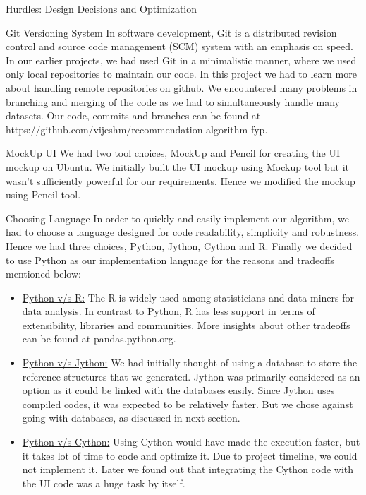 \documentclass{report}
\begin{document}
\begin{projChapter}{Hurdles: Design Decisions and Optimization}
\begin{projSection}{Git Versioning System}
            In software development, Git is a distributed revision control and source code management (SCM) system with an emphasis on speed.  In our earlier projects, we had used Git in a minimalistic manner, where we used only local repositories to maintain our code. In this project we had to learn more about handling remote repositories on github. We encountered many problems in branching and merging of the code as we had to simultaneously handle many datasets. Our code, commits and branches can be found at 
            ~\\
            https://github.com/vijeshm/recommendation-algorithm-fyp.
        \end{projSection}
\begin{projSection}{MockUp UI}
            We had two tool choices, MockUp and Pencil for creating the UI mockup on Ubuntu. We initially built the UI mockup using Mockup tool but it wasn't sufficiently powerful for our requirements. Hence we modified the mockup using Pencil tool.
        \end{projSection}
\begin{projSection}{Choosing Language}
            In order to quickly and easily implement our algorithm, we had to choose a language designed for code readability, simplicity and robustness. Hence we had three choices, Python, Jython, Cython and R. Finally we decided to use Python as our implementation language for the reasons and tradeoffs mentioned below:
            
\begin{itemize}
  \item \underline{Python v/s R:} The R is widely used among statisticians and data-miners for data analysis. In contrast to Python, R has less support in terms of extensibility, libraries and communities. More insights about other tradeoffs can be found at  pandas.python.org.
  \item \underline{Python v/s Jython:} We had initially thought of using a database to store the reference structures that we generated. Jython was primarily considered as an option as it could be linked with the databases easily. Since Jython uses compiled codes, it was expected to be relatively faster.  But we chose against going with databases, as discussed in next section.
  \item \underline{Python v/s Cython:} Using Cython would have made the execution faster, but it takes lot of time to code and optimize it. Due to project timeline, we could not implement it. Later we found out that integrating the Cython code with the UI code was a huge task by itself.
\end{itemize}


\end{projSection}
\end{projChapter}
\end{document}
